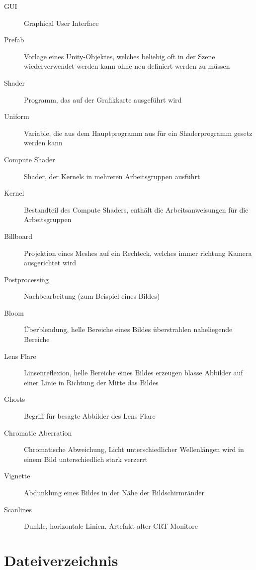 \documentclass[a4paper,ngerman,12pt]{report}
\begin{document}
\begin{description}
\item[GUI] Graphical User Interface
\item[Prefab] Vorlage eines Unity-Objektes, welches beliebig oft in der Szene wiederverwendet werden kann ohne neu definiert werden zu müssen
\vspace{5mm}
\item[Shader] Programm, das auf der Grafikkarte ausgeführt wird
\item[Uniform] Variable, die aus dem Hauptprogramm aus für ein Shaderprogramm gesetz werden kann
\item[Compute Shader] Shader, der Kernels in mehreren Arbeitsgruppen ausführt
\item[Kernel] Bestandteil des Compute Shaders, enthält die Arbeitsanweisungen für die Arbeitsgruppen
\item[Billboard] Projektion eines Meshes auf ein Rechteck, welches immer richtung Kamera ausgerichtet wird
\vspace{5mm}
\item[Postprocessing] Nachbearbeitung (zum Beispiel eines Bildes)
\item[Bloom] Überblendung, helle Bereiche eines Bildes überstrahlen naheliegende Bereiche
\item[Lens Flare] Linsenreflexion, helle Bereiche eines Bildes erzeugen blasse Abbilder auf einer Linie in Richtung der Mitte das Bildes
\item[Ghosts] Begriff für besagte Abbilder des Lens Flare
\item[Chromatic Aberration] Chromatische Abweichung, Licht unterschiedlicher Wellenlängen wird in einem Bild unterschiedlich stark verzerrt
\item[Vignette] Abdunklung eines Bildes in der Nähe der Bildschirmränder
\item[Scanlines] Dunkle, horizontale Linien. Artefakt alter CRT Monitore
\end{description}




\chapter{Dateiverzeichnis}
\end{document}
